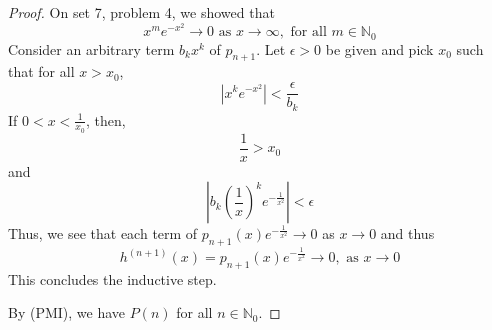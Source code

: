 \documentclass[12pt, reqno]{amsart}
\theoremstyle{definition}
\theoremstyle{remark}
\begin{document}
\begin{itemize}
\begin{itemize}
\begin{proof}
    On set 7, problem 4, we showed that $$x^{m}e^{- x^{2}}\rightarrow 0\text{ as }x \rightarrow \infty,\text{ for all }m\in \mathbb{N}_{0}$$
    Consider an arbitrary term $b_{k}x^{k}$ of $p_{n+1}$. Let $\epsilon>0$ be given and pick $x_{0}$ such that for all $x>x_{0}$, $$|x^{k}e^{- x^{2}}|< \frac{\epsilon}{b_{k}}$$
    If $0<x< \frac{1}{x_{0}}$, then, $$\frac{1}{x}>x_{0}$$and $$\left|b_{k} \left(\frac{1}{x}\right)^{k}e^{- \frac{1}{x^{2}}}\right|<\epsilon$$Thus, we see that each term of $p_{n+1}(x)e^{- \frac{1}{x^{2}}}\rightarrow 0$ as $x \rightarrow 0$ and thus $$h^{(n+1)}(x)= p_{n+1}(x)e^{- \frac{1}{x^{2}}}\rightarrow 0,\text{ as }x \rightarrow 0$$
    This concludes the inductive step.
    
    \vspace*{10 pt}
    By (PMI), we have $P(n)$ for all $n\in \mathbb{N}_{0}$. 
    
    
\end{proof}




\end{itemize}
\end{itemize}
\end{document}
